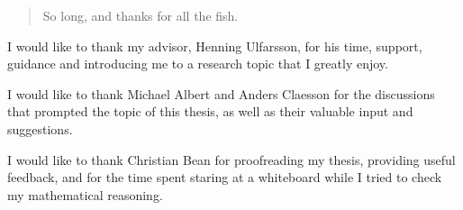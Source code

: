 \begin{quotation}
So long, and thanks for all the fish.
\end{quotation}
\vspace{\baselineskip}

I would like to thank my advisor, Henning Ulfarsson, for his time, support,
guidance and introducing me to a research topic that I greatly enjoy.

I would like to thank Michael Albert and Anders Claesson for the discussions that
prompted the topic of this thesis, as well as their valuable input and suggestions.

I would like to thank Christian Bean for proofreading my thesis, providing useful
feedback, and for the time spent staring at a whiteboard while I tried to check
my mathematical reasoning.
